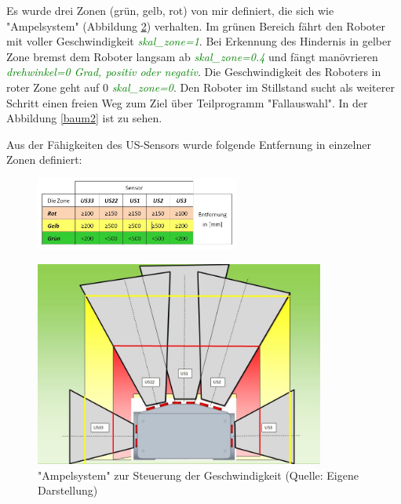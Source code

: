 Es wurde drei Zonen (grün, gelb, rot) von mir definiert, die sich wie "Ampelsystem"  (Abbildung \ref{zone}) verhalten. Im grünen Bereich fährt den Roboter mit voller Geschwindigkeit \textcolor{green}{\textit{skal\_zone=1}}. Bei Erkennung des Hindernis in gelber Zone bremst dem Roboter langsam ab \textcolor{green}{\textit{skal\_zone=0.4}} und fängt manövrieren \textcolor{green}{\textit{drehwinkel=0 Grad, positiv oder negativ}}. Die Geschwindigkeit  des Roboters in roter Zone geht auf 0 \textcolor{green}{\textit{skal\_zone=0}}. Den Roboter im Stillstand sucht als weiterer Schritt einen freien Weg zum Ziel über Teilprogramm "Fallauswahl". In der Abbildung \ref{baum2} ist zu sehen.

Aus der Fähigkeiten des US-Sensors wurde folgende Entfernung in einzelner Zonen definiert:
\begin{figure}[!h]  %
	\centering\includegraphics[width=0.60\textwidth]{images/entf.jpg}
	\label{entf} %
\end{figure}

\begin{figure}[!h]  %
	\centering\includegraphics[width=0.85\textwidth]{images/H-UMF.jpg}
	\caption{ "Ampelsystem" zur Steuerung der Geschwindigkeit \newline (Quelle: Eigene Darstellung)}
	\label{zone} %
\end{figure}

